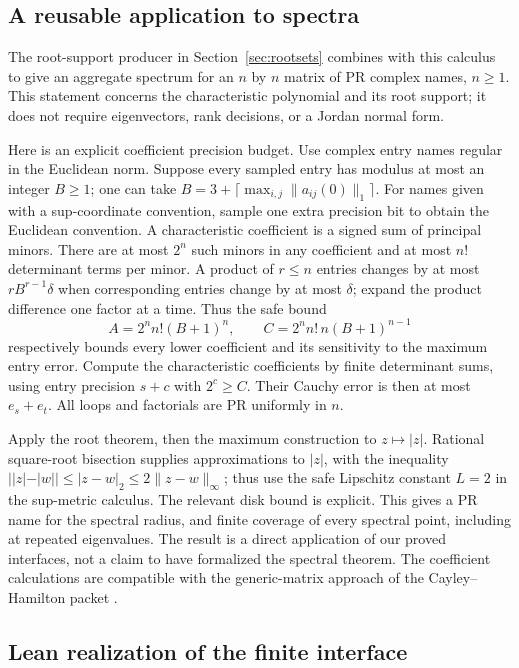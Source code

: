 \subsection{A reusable application to spectra}

The root-support producer in Section~\ref{sec:rootsets} combines with
this calculus to give an aggregate spectrum for an $n$ by $n$ matrix
of PR complex names, $n\ge1$. This statement concerns the characteristic
polynomial and its root support; it does not require eigenvectors,
rank decisions, or a Jordan normal form.

Here is an explicit coefficient precision budget. Use complex entry
names regular in the Euclidean norm. Suppose every sampled
entry has modulus at most an integer $B\ge1$; one can take
$B=3+\lceil\max_{i,j}\|a_{ij}(0)\|_1\rceil$.
For names given with a sup-coordinate convention, sample one extra
precision bit to obtain the Euclidean convention. A characteristic
coefficient is a signed sum of principal minors. There are at most
$2^n$ such minors in any coefficient and at most $n!$ determinant terms
per minor. A product of $r\le n$ entries changes by at most
$rB^{r-1}\delta$ when corresponding entries change by at most $\delta$;
expand the product difference one factor at a time. Thus the safe bound
\[
 A=2^n n!(B+1)^n,\qquad
 C=2^n n!\,n(B+1)^{n-1}
\]
respectively bounds every lower coefficient and its sensitivity to the
maximum entry error. Compute the characteristic coefficients by finite
determinant sums, using entry precision $s+c$ with $2^c\ge C$.
Their Cauchy error is then at most $e_s+e_t$. All loops and factorials
are PR uniformly in $n$.

Apply the root theorem, then the maximum construction to $z\mapsto|z|$.
Rational square-root bisection supplies approximations to $|z|$, with
the inequality $||z|-|w||\le|z-w|_2\le2\|z-w\|_\infty$;
thus use the safe Lipschitz constant $L=2$ in the sup-metric calculus.
The relevant disk bound is explicit.
This gives a PR name for the spectral radius, and finite coverage of
every spectral point, including at repeated eigenvalues. The result is
a direct application of our proved interfaces, not a claim to have
formalized the spectral theorem. The coefficient calculations are
compatible with the generic-matrix approach of the Cayley--Hamilton
packet \cite{repo-cayley}.

\subsection{Lean realization of the finite interface}

